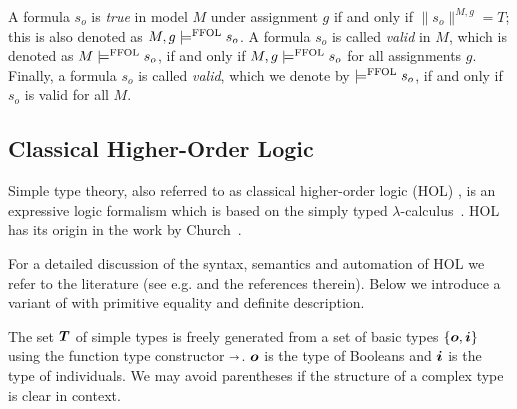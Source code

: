 \begin{definition}[Validity]\label{ffollvalid}
  A formula $s_o$ is \emph{true} in model $M$ under assignment $g$ if and only if
  $\|s_o\|^{M,g} = T$; this is also denoted as $M,g \models^{\text{\textrm{FFOL}}} s_o$.  A
  formula $s_o$ is called \emph{valid} in $M$, which is denoted as
  $M \models^{\text{\textrm{FFOL}}} s_o$, if and only if $M,g \models^{\text{\textrm{FFOL}}} s_o$ for all assignments
  $g$. Finally, a formula $s_o$ is called \emph{valid}, which we
  denote by $\models^{\text{\textrm{FFOL}}} s_o$, if and only if $s_o$ is valid for all
  $M$. 
\end{definition}


\subsection{Classical Higher-Order Logic}
Simple type theory, also referred to as classical higher-order logic
(HOL) \cite{AndrewsSEP}, is an expressive logic formalism which is based on the simply typed
$\lambda$-calculus~\cite{barendregt13book}. 
  HOL has its origin in the work by
  Church~\cite{Church40}.

For a detailed discussion of the syntax, semantics and automation
of  HOL we refer to the literature (see e.g.
\cite{AndrewsSEP,B5,J6} and the
references therein). Below we introduce a variant of \HOL with primitive equality
and definite description. 



\begin{definition}[Types]\label{holtypes}
  The set $\boldsymbol{T}$ of simple types is freely generated from a set of
  basic types $\{\boldsymbol{o}, \boldsymbol{i}\}$ using the function type
  constructor $\boldsymbol{\shortrightarrow}$. $\boldsymbol{o}$ is the type of Booleans and 
  $\boldsymbol{i}$ is the type of individuals. We
  may avoid parentheses if the structure of a complex type is clear in context.
\end{definition}


